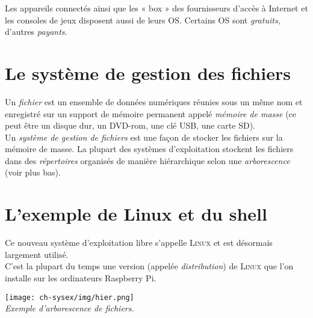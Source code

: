 
	Les appareils connectés ainsi que les « box »  des fournisseurs d'accès à Internet et les consoles de jeux disposent aussi de leurs OS.
	Certains OS sont \textit{gratuits}, d'autres \textit{payants}.
	
	\section{Le système de gestion des fichiers}
	
	Un \textit{fichier} est un ensemble de données numériques réunies sous un même nom et enregistré sur un support de mémoire permanent appelé \textit{mémoire de masse} (ce peut être un disque dur, un DVD-rom, une clé USB, une carte SD).\\
	Un \textit{système de gestion de fichiers} est une façon de stocker les fichiers sur la mémoire de masse. La plupart des systèmes d'exploitation stockent les fichiers dans des \textit{répertoires} organisés de manière hiérarchique selon une \textit{arborescence} (voir plus bas).

	\section{L'exemple de Linux et du shell}

	\medskip\par
	Ce nouveau système d'exploitation libre s'appelle \textsc{Linux} et est désormais largement utilisé.\\
	C'est la plupart du temps une version (appelée \textit{distribution}) de \textsc{Linux} que l'on installe sur les ordinateurs Raspberry Pi.
	
	\begin{center}
		\texttt{[image: ch-sysex/img/hier.png]}\\
		\footnotesize\textit{Exemple d'arborescence de fichiers.}
	\end{center}

